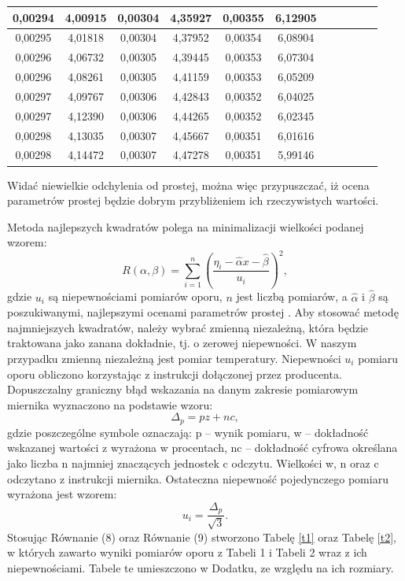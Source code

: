 \documentclass[10pt,a4paper]{article}
\begin{document}
\begin{center}
\begin{table}[h!]
\begin{tabular}{|c|c|c|c|c|c|c|c|c|c|c|}
0,00294 & 4,00915 & 0,00304 & 4,35927 & 0,00355 & 6,12905 \\ \hline
0,00295 & 4,01818 & 0,00304 & 4,37952 & 0,00354 & 6,08904 \\ \hline
0,00296 & 4,06732 & 0,00305 & 4,39445 & 0,00353 & 6,07304 \\ \hline
0,00296 & 4,08261 & 0,00305 & 4,41159 & 0,00353 & 6,05209 \\ \hline
0,00297 & 4,09767 & 0,00306 & 4,42843 & 0,00352 & 6,04025 \\ \hline
0,00297 & 4,12390 & 0,00306 & 4,44265 & 0,00352 & 6,02345 \\ \hline
0,00298 & 4,13035 & 0,00307 & 4,45667 & 0,00351 & 6,01616 \\ \hline
0,00298 & 4,14472 & 0,00307 & 4,47278 & 0,00351 & 5,99146 \\ \hline
 \end{tabular}
 \end{table}
 \end{center}

Widać niewielkie odchylenia od prostej, można więc przypuszczać, iż ocena parametrów prostej będzie dobrym przybliżeniem ich rzeczywistych wartości.
 

Metoda najlepszych kwadratów polega na minimalizacji wielkości podanej wzorem:
\begin{equation}
 R(\alpha,\beta)=\sum_{i=1}^n\left(\dfrac{\eta_i-\hat{\alpha}x-\hat{\beta}}{u_i}\right)^2 ,
\end{equation}
 gdzie $u_i$ są niepewnościami pomiarów oporu, $n$ jest liczbą pomiarów, a $\hat{\alpha}$ i $\hat{\beta}$ są poszukiwanymi, najlepszymi ocenami parametrów prostej \cite{tay1}. Aby stosować metodę najmniejszych kwadratów, należy wybrać zmienną niezależną, która będzie traktowana jako zanana dokładnie, tj. o zerowej niepewności. W naszym przypadku zmienną niezależną jest pomiar temperatury. 
 Niepewności $u_i$ pomiaru oporu obliczono korzystając z instrukcji dołączonej przez producenta. Dopuszczalny graniczny błąd wskazania na danym zakresie pomiarowym miernika wyznaczono na podstawie wzoru:
\begin{equation}
\Delta_{p}=pz+nc,
\end{equation}
gdzie poszczególne symbole oznaczają: p – wynik pomiaru, w – dokładność wskazanej wartości z wyrażona w procentach, nc – dokładność cyfrowa określana jako liczba n najmniej znaczących jednostek c odczytu. Wielkości w, n oraz c odczytano z instrukcji miernika. 
Ostateczna niepewność pojedynczego pomiaru wyrażona jest wzorem:
\begin{equation}
u_{i}=\dfrac{\Delta_{p}}{\sqrt{3}}.
\end{equation}
Stosując Równanie (8) oraz Równanie (9) stworzono Tabelę \ref{t1} oraz Tabelę \ref{t2}, w których zawarto wyniki pomiarów oporu z Tabeli 1 i Tabeli 2 wraz z ich niepewnościami. Tabele te umieszczono w Dodatku, ze względu na ich rozmiary. 
\end{document}
